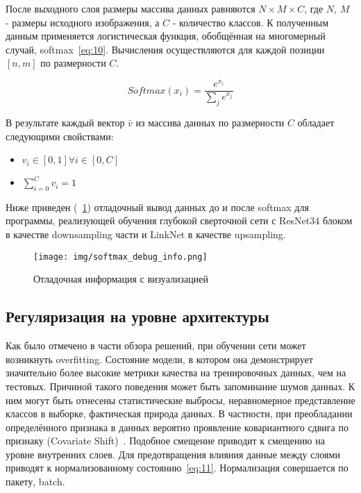После выходного слоя размеры массива данных равняются $ N \times M \times C $, где $N$, $M$ - размеры исходного изображения, а $C$ - количество классов.
К полученным данным применяется логистическая функция, обобщённая на многомерный случай, softmax~\eqref{eq:10}.
Вычисления осуществляются для каждой позиции $ [n, m] $ по размерности $C$\@.

\begin{equation}
    \label{eq:10}
    Softmax(x_{i}) = \frac{{}e^{x_{i}}}{\sum_{j}e^{x_{j}}}
\end{equation}

В результате каждый вектор $\bar{v}$ из массива данных по размерности $C$ обладает следующими свойствами:

\begin{itemize}
    \item $v_{i} \in [0,1] \forall i \in [0, C]$ \\
    \item $\sum_{i=0}^{C} v_{i}=1$
\end{itemize}

Ниже приведен (~\ref{fig:softmax_debug_info}) отладочный вывод данных до и после softmax для программы, реализующей обучения глубокой сверточной сети с ResNet34 блоком в качестве downsampling части
и LinkNet в качестве upsampling.

\begin{figure}[H]
    \centering
    \texttt{[image: img/softmax\_debug\_info.png]}
    \caption{Отладочная информация с визуализацией}
    \label{fig:softmax_debug_info}
\end{figure}

\subsection{Регуляризация на уровне архитектуры}

Как было отмечено в части обзора решений, при обучении сети может возникнуть overfitting.
Состояние модели, в котором она демонстрирует значительно более высокие метрики качества на тренировочных данных,
чем на тестовых.
Причиной такого поведения может быть запоминание шумов данных.
К ним могут быть отнесены статистические выбросы, неравномерное представление классов в выборке, фактическая природа данных.
В частности, при преобладании определённого признака в данных вероятно проявление ковариантного сдвига по признаку (Covariate Shift)~\autocite{covariateShift}.
Подобное смещение приводит к смещению на уровне внутренних слоев.
Для предотвращения влияния данные между слоями приводят к нормализованному состоянию~\eqref{eq:11}.
Нормализация совершается по пакету, batch.


